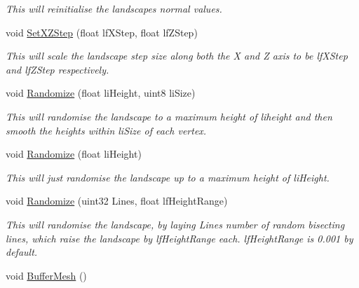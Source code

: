 \begin{DoxyCompactItemize}
\begin{DoxyCompactList}\small\item\em This will reinitialise the landscapes normal values. \end{DoxyCompactList}\item 
\hypertarget{classcm_landscape_a074a4aa5de458c966817b57b8822d470}{
void \hyperlink{classcm_landscape_a074a4aa5de458c966817b57b8822d470}{SetXZStep} (float lfXStep, float lfZStep)}
\label{classcm_landscape_a074a4aa5de458c966817b57b8822d470}

\begin{DoxyCompactList}\small\item\em This will scale the landscape step size along both the X and Z axis to be lfXStep and lfZStep respectively. \end{DoxyCompactList}\item 
\hypertarget{classcm_landscape_a0ee9507ed64e727af58ccfaacd88d333}{
void \hyperlink{classcm_landscape_a0ee9507ed64e727af58ccfaacd88d333}{Randomize} (float liHeight, uint8 liSize)}
\label{classcm_landscape_a0ee9507ed64e727af58ccfaacd88d333}

\begin{DoxyCompactList}\small\item\em This will randomise the landscape to a maximum height of liheight and then smooth the heights within liSize of each vertex. \end{DoxyCompactList}\item 
\hypertarget{classcm_landscape_a3196745ccd7e5d3f37463602732180c2}{
void \hyperlink{classcm_landscape_a3196745ccd7e5d3f37463602732180c2}{Randomize} (float liHeight)}
\label{classcm_landscape_a3196745ccd7e5d3f37463602732180c2}

\begin{DoxyCompactList}\small\item\em This will just randomise the landscape up to a maximum height of liHeight. \end{DoxyCompactList}\item 
\hypertarget{classcm_landscape_a09446d68d55f92099236f2773ab24828}{
void \hyperlink{classcm_landscape_a09446d68d55f92099236f2773ab24828}{Randomize} (uint32 Lines, float lfHeightRange)}
\label{classcm_landscape_a09446d68d55f92099236f2773ab24828}

\begin{DoxyCompactList}\small\item\em This will randomise the landscape, by laying Lines number of random bisecting lines, which raise the landscape by lfHeightRange each. lfHeightRange is 0.001 by default. \end{DoxyCompactList}\item 
\hypertarget{classcm_landscape_af71af80653f52a4a355386f677f1fdc2}{
void \hyperlink{classcm_landscape_af71af80653f52a4a355386f677f1fdc2}{BufferMesh} ()}
\label{classcm_landscape_af71af80653f52a4a355386f677f1fdc2}


\end{DoxyCompactItemize}
